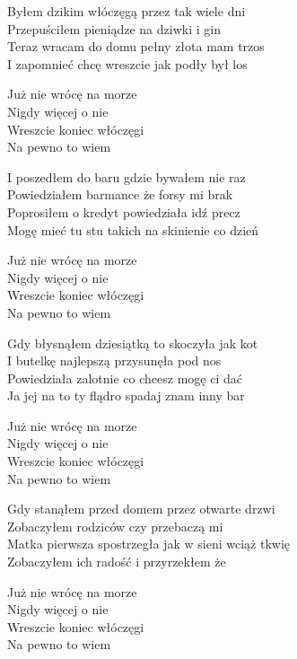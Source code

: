 \begin{text}

    Byłem dzikim włóczęgą przez tak wiele dni\\
    Przepuściłem pieniądze na dziwki i gin\\
    Teraz wracam do domu pełny złota mam trzos\\
    I zapomnieć chcę wreszcie jak podły był los

    \vin Już nie wrócę na morze\\
    \vin Nigdy więcej o nie\\
    \vin Wreszcie koniec włóczęgi\\
    \vin Na pewno to wiem

    I poszedłem do baru gdzie bywałem nie raz\\
    Powiedziałem barmance że forsy mi brak\\
    Poprosiłem o kredyt powiedziała idź precz\\
    Mogę mieć tu stu takich na skinienie co dzień

    \vin Już nie wrócę na morze\\
    \vin Nigdy więcej o nie\\
    \vin Wreszcie koniec włóczęgi\\
    \vin Na pewno to wiem

    Gdy błysnąłem dziesiątką to skoczyła jak kot\\
    I butelkę najlepszą przysunęła pod nos\\
    Powiedziała zalotnie co chcesz mogę ci dać\\
    Ja jej na to ty flądro spadaj znam inny bar

    \vin Już nie wrócę na morze\\
    \vin Nigdy więcej o nie\\
    \vin Wreszcie koniec włóczęgi\\
    \vin Na pewno to wiem

    Gdy stanąłem przed domem przez otwarte drzwi\\
    Zobaczyłem rodziców czy przebaczą mi\\
    Matka pierwsza spostrzegła jak w sieni wciąż tkwię\\
    Zobaczyłem ich radość i przyrzekłem że

    \vin Już nie wrócę na morze\\
    \vin Nigdy więcej o nie\\
    \vin Wreszcie koniec włóczęgi\\
    \vin Na pewno to wiem

\end{text}
